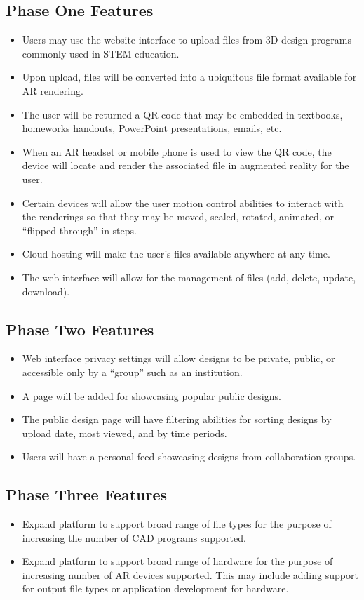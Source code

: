 \subsection{Phase One Features}
\begin{itemize}
	\item Users may use the website interface to upload files from 3D design programs commonly used in STEM education. 
	\item  Upon upload, files will be converted into a ubiquitous file format available for AR rendering. 
	\item The user will be returned a QR code that may be embedded in textbooks, homeworks handouts, PowerPoint presentations, emails, etc. 
	\item When an AR headset or mobile phone is used to view the QR code, the device will locate and render the associated file in augmented reality for the user.  
	\item Certain devices will allow the user motion control abilities to interact with the renderings so that they may be moved, scaled, rotated, animated, or “flipped through” in steps. 
	\item Cloud hosting will make the user’s files available anywhere at any time. 
	\item The web interface will allow for the management of files (add, delete, update, download). 
\end{itemize}

\subsection{Phase Two Features}
\begin{itemize}
	\item Web interface privacy settings will allow designs to be private, public, or accessible only by a “group” such as an institution. 
	\item A page will be added for showcasing popular public designs. 
	\item The public design page will have filtering abilities for sorting designs by upload date, most viewed, and by time periods. 
	\item Users will have a personal feed showcasing designs from collaboration groups. 
\end{itemize}

\subsection{Phase Three Features}
\begin{itemize}
	\item Expand platform to support broad range of file types for the purpose of increasing the number of CAD programs supported. 
	\item Expand platform to support broad range of hardware for the purpose of increasing number of AR devices supported. This may include adding support for output file types or application development for hardware. 
\end{itemize}


